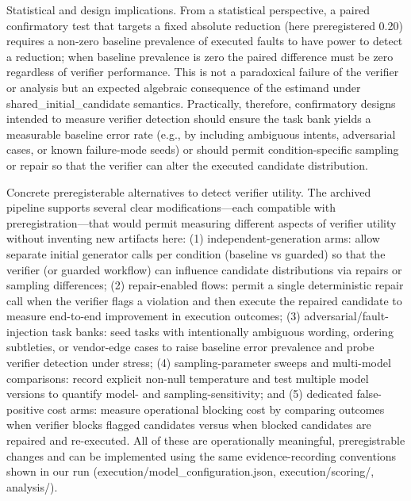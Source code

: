 \documentclass[conference]{IEEEtran}
\begin{document}
Statistical and design implications. From a statistical perspective, a paired confirmatory test that targets a fixed absolute reduction (here preregistered 0.20) requires a non-zero baseline prevalence of executed faults to have power to detect a reduction; when baseline prevalence is zero the paired difference must be zero regardless of verifier performance. This is not a paradoxical failure of the verifier or analysis but an expected algebraic consequence of the estimand under shared\_initial\_candidate semantics. Practically, therefore, confirmatory designs intended to measure verifier detection should ensure the task bank yields a measurable baseline error rate (e.g., by including ambiguous intents, adversarial cases, or known failure-mode seeds) or should permit condition-specific sampling or repair so that the verifier can alter the executed candidate distribution.

Concrete preregisterable alternatives to detect verifier utility. The archived pipeline supports several clear modifications---each compatible with preregistration---that would permit measuring different aspects of verifier utility without inventing new artifacts here: (1) independent-generation arms: allow separate initial generator calls per condition (baseline vs guarded) so that the verifier (or guarded workflow) can influence candidate distributions via repairs or sampling differences; (2) repair-enabled flows: permit a single deterministic repair call when the verifier flags a violation and then execute the repaired candidate to measure end-to-end improvement in execution outcomes; (3) adversarial/fault-injection task banks: seed tasks with intentionally ambiguous wording, ordering subtleties, or vendor-edge cases to raise baseline error prevalence and probe verifier detection under stress; (4) sampling-parameter sweeps and multi-model comparisons: record explicit non-null temperature and test multiple model versions to quantify model- and sampling-sensitivity; and (5) dedicated false-positive cost arms: measure operational blocking cost by comparing outcomes when verifier blocks flagged candidates versus when blocked candidates are repaired and re-executed. All of these are operationally meaningful, preregistrable changes and can be implemented using the same evidence-recording conventions shown in our run (execution/model\_configuration.json, execution/scoring/, analysis/).
\end{document}
